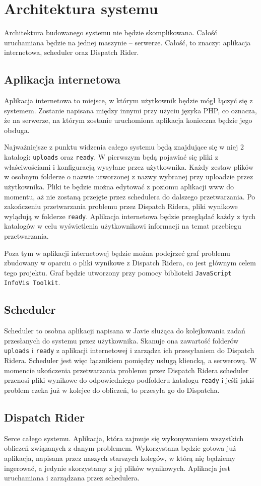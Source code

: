 \chapter{Architektura systemu}
Architektura budowanego systemu nie będzie skomplikowana. Całość uruchamiana
będzie na jednej maszynie -- serwerze. Całość, to znaczy: aplikacja internetowa, scheduler
oraz Dispatch Rider.
\section{Aplikacja internetowa}
Aplikacja internetowa to miejsce, w którym użytkownik będzie mógł łączyć się z systemem.
Zostanie napisana między innymi przy użyciu języka PHP, co oznacza, że na serwerze,
na którym zostanie uruchomiona aplikacja konieczna będzie jego obsługa.

Najważniejsze z punktu widzenia całego systemu będą znajdujące się w niej 2 katalogi: \texttt{uploads}
oraz \texttt{ready}. W pierwszym będą pojawiać się pliki z właściwościami i konfiguracją wysyłane przez 
użytkownika. Każdy zestaw plików w osobnym folderze o nazwie utworzonej z nazwy wybranej przy uploadzie
przez użytkownika. Pliki te będzie można edytować z poziomu aplikacji www do momentu, aż nie zostaną
przejęte przez schedulera do dalszego przetwarzania. Po zakończeniu przetwarzania problemu przez Dispatch
Ridera, pliki wynikowe wylądują w folderze \texttt{ready}. Aplikacja internetowa będzie przeglądać
każdy z tych katalogów w celu wyświetlenia użytkownikowi informacji na temat przebiegu przetwarzania.

Poza tym w aplikacji internetowej będzie można podejrzeć graf problemu zbudowany w oparciu o pliki
wynikowe z Dispatch Ridera, co jest głównym celem tego projektu. Graf będzie utworzony przy pomocy
biblioteki \texttt{JavaScript InfoVis Toolkit}.

\section{Scheduler}
Scheduler to osobna aplikacji napisana w Javie służąca do kolejkowania zadań przesłanych do systemu
przez użytkownika. Skanuje ona zawartość folderów \texttt{uploads} i \texttt{ready} z aplikacji internetowej
i zarządza ich przesyłaniem do Dispatch Ridera. Scheduler jest więc łącznikiem pomiędzy usługą kliencką,
a serwerową. W momencie ukończenia przetwarzania problemu przez Dispatch Ridera scheduler przenosi pliki
wynikowe do odpowiedniego podfolderu katalogu \texttt{ready} i jeśli jakiś problem czeka już w kolejce
do obliczeń, to przesyła go do Dispatcha.

\section{Dispatch Rider}
Serce całego systemu. Aplikacja, która zajmuje się wykonywaniem wszystkich obliczeń związanych z danym problemem.
Wykorzystana będzie gotowa już aplikacja, napisana przez naszych starszych kolegów, w którą nię będziemy
ingerować, a jedynie skorzystamy z jej plików wynikowych. Aplikacja jest uruchamiana i zarządzana przez schedulera.